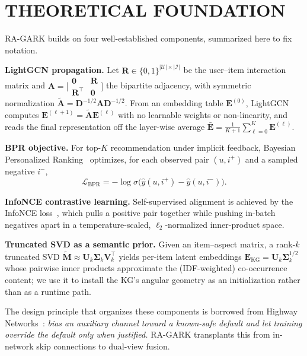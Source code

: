 \documentclass[12pt,a4paper]{article}
\begin{document}
\section{THEORETICAL FOUNDATION}
\label{sec:theory}

RA-GARK builds on four well-established components, summarized here to fix notation.

\textbf{LightGCN propagation.} Let $\mathbf{R}\in\{0,1\}^{|\mathcal{U}|\times|\mathcal{I}|}$ be the user--item interaction matrix and $\mathbf{A}=\bigl[\begin{smallmatrix}\mathbf{0}&\mathbf{R}\\ \mathbf{R}^{\top}&\mathbf{0}\end{smallmatrix}\bigr]$ the bipartite adjacency, with symmetric normalization $\tilde{\mathbf{A}}=\mathbf{D}^{-1/2}\mathbf{A}\mathbf{D}^{-1/2}$. From an embedding table $\mathbf{E}^{(0)}$, LightGCN computes $\mathbf{E}^{(\ell+1)}=\tilde{\mathbf{A}}\mathbf{E}^{(\ell)}$ with no learnable weights or non-linearity, and reads the final representation off the layer-wise average $\bar{\mathbf{E}}=\frac{1}{K+1}\sum_{\ell=0}^{K}\mathbf{E}^{(\ell)}$.

\textbf{BPR objective.} For top-$K$ recommendation under implicit feedback, Bayesian Personalized Ranking~\cite{rendle2009bpr} optimizes, for each observed pair $(u,i^{+})$ and a sampled negative $i^{-}$,
\begin{equation}
\label{eq:bpr}
\mathcal{L}_{\mathrm{BPR}}=-\log\sigma\!\bigl(\hat{y}(u,i^{+})-\hat{y}(u,i^{-})\bigr).
\end{equation}

\textbf{InfoNCE contrastive learning.} Self-supervised alignment is achieved by the InfoNCE loss~\cite{oord2018infonce}, which pulls a positive pair together while pushing in-batch negatives apart in a temperature-scaled, $\ell_2$-normalized inner-product space.

\textbf{Truncated SVD as a semantic prior.} Given an item--aspect matrix, a rank-$k$ truncated SVD $\tilde{\mathbf{M}}\approx\mathbf{U}_k\boldsymbol{\Sigma}_k\mathbf{V}_k^{\top}$ yields per-item latent embeddings $\mathbf{E}_{\mathrm{KG}}=\mathbf{U}_k\boldsymbol{\Sigma}_k^{1/2}$ whose pairwise inner products approximate the (IDF-weighted) co-occurrence content; we use it to install the KG's angular geometry as an initialization rather than as a runtime path.

The design principle that organizes these components is borrowed from Highway Networks~\cite{srivastava2015highway}: \emph{bias an auxiliary channel toward a known-safe default and let training override the default only when justified.} RA-GARK transplants this from in-network skip connections to dual-view fusion.
\end{document}
